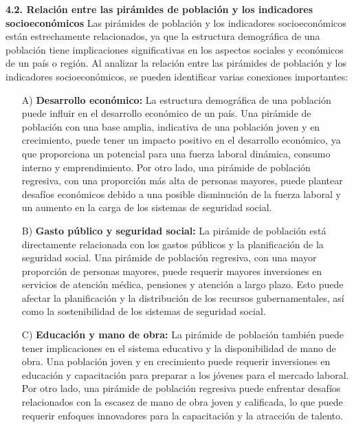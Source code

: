 \documentclass[8pt,a4paper]{beamer}
\begin{document}
{\begin{frame}{}
\begin{block}{\textbf{4.2. Relación entre las pirámides de población y los indicadores socioeconómicos}}
\justifying
Las pirámides de población y los indicadores socioeconómicos están estrechamente relacionados, ya que la estructura demográfica de una población tiene implicaciones significativas en los aspectos sociales y económicos de un país o región. Al analizar la relación entre las pirámides de población y los indicadores socioeconómicos, se pueden identificar varias conexiones importantes:
\begin{enumerate}
\justifying
\item[A)] \textbf{Desarrollo económico:} La estructura demográfica de una población puede influir en el desarrollo económico de un país. Una pirámide de población con una base amplia, indicativa de una población joven y en crecimiento, puede tener un impacto positivo en el desarrollo económico, ya que proporciona un potencial para una fuerza laboral dinámica, consumo interno y emprendimiento. Por otro lado, una pirámide de población regresiva, con una proporción más alta de personas mayores, puede plantear desafíos económicos debido a una posible disminución de la fuerza laboral y un aumento en la carga de los sistemas de seguridad social.

\item[B)] \textbf{Gasto público y seguridad social:} La pirámide de población está directamente relacionada con los gastos públicos y la planificación de la seguridad social. Una pirámide de población regresiva, con una mayor proporción de personas mayores, puede requerir mayores inversiones en servicios de atención médica, pensiones y atención a largo plazo. Esto puede afectar la planificación y la distribución de los recursos gubernamentales, así como la sostenibilidad de los sistemas de seguridad social.

\end{enumerate}
\end{block}
\end{frame}

\begin{frame}{}
\begin{block}{}
\justifying

\begin{enumerate}
\justifying
\item[C)] \textbf{Educación y mano de obra:} La pirámide de población también puede tener implicaciones en el sistema educativo y la disponibilidad de mano de obra. Una población joven y en crecimiento puede requerir inversiones en educación y capacitación para preparar a los jóvenes para el mercado laboral. Por otro lado, una pirámide de población regresiva puede enfrentar desafíos relacionados con la escasez de mano de obra joven y calificada, lo que puede requerir enfoques innovadores para la capacitación y la atracción de talento.


\end{enumerate}
\end{block}
\end{frame}}
\end{document}
